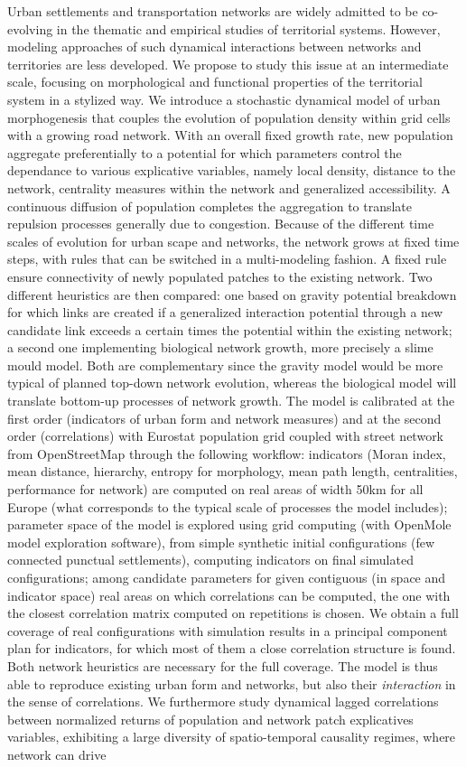 Urban settlements and transportation networks are widely admitted to be co-evolving in the thematic and empirical studies of territorial systems. However, modeling approaches of such dynamical interactions between networks and territories are less developed. We propose to study this issue at an intermediate scale, focusing on morphological and functional properties of the territorial system in a stylized way. We introduce a stochastic dynamical model of urban morphogenesis that couples the evolution of population density within grid cells with a growing road network. With an overall fixed growth rate, new population aggregate preferentially to a potential for which parameters control the dependance to various explicative variables, namely local density, distance to the network, centrality measures within the network and generalized accessibility. A continuous diffusion of population completes the aggregation to translate repulsion processes generally due to congestion. Because of the different time scales of evolution for urban scape and networks, the network grows at fixed time steps, with rules that can be switched in a multi-modeling fashion. A fixed rule ensure connectivity of newly populated patches to the existing network. Two different heuristics are then compared: one based on gravity potential breakdown for which links are created if a generalized interaction potential through a new candidate link exceeds a certain times the potential within the existing network; a second one implementing biological network growth, more precisely a slime mould model. Both are complementary since the gravity model would be more typical of planned top-down network evolution, whereas the biological model will translate bottom-up processes of network growth. The model is calibrated at the first order (indicators of urban form and network measures) and at the second order (correlations) with Eurostat population grid coupled with street network from OpenStreetMap through the following workflow: indicators (Moran index, mean distance, hierarchy, entropy for morphology, mean path length, centralities, performance for network) are computed on real areas of width 50km for all Europe (what corresponds to the typical scale of processes the model includes); parameter space of the model is explored using grid computing (with OpenMole model exploration software), from simple synthetic initial configurations (few connected punctual settlements), computing indicators on final simulated configurations; among candidate parameters for given contiguous (in space and indicator space) real areas on which correlations can be computed, the one with the closest correlation matrix computed on repetitions is chosen. We obtain a full coverage of real configurations with simulation results in a principal component plan for indicators, for which most of them a close correlation structure is found. Both network heuristics are necessary for the full coverage. The model is thus able to reproduce existing urban form and networks, but also their \emph{interaction} in the sense of correlations. We furthermore study dynamical lagged correlations between normalized returns of population and network patch explicatives variables, exhibiting a large diversity of spatio-temporal causality regimes, where network can drive 